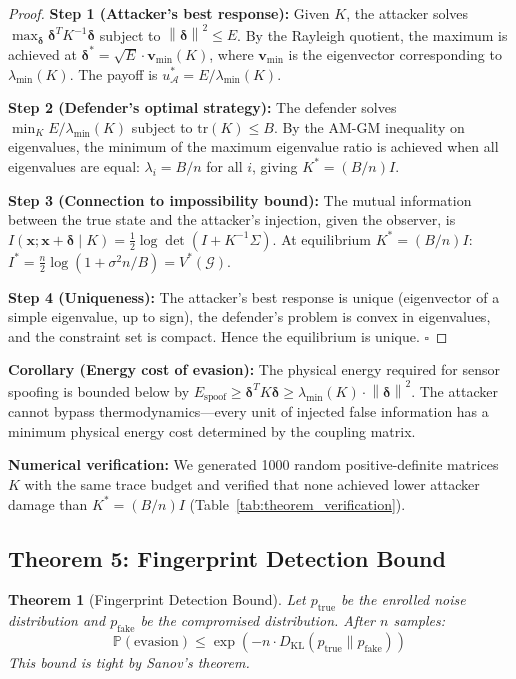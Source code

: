\documentclass[journal]{IEEEtran}
\newtheorem{theorem}{Theorem}
\newcommand{\norm}[1]{\left\|#1\right\|}
\newcommand{\Prob}{\mathbb{P}}
\newcommand{\KL}{D_{\mathrm{KL}}}
\begin{document}
\begin{proof}
\textbf{Step 1 (Attacker's best response):} Given $K$, the attacker solves $\max_{\bm{\delta}} \bm{\delta}^T K^{-1} \bm{\delta}$ subject to $\norm{\bm{\delta}}^2 \le E$. By the Rayleigh quotient, the maximum is achieved at $\bm{\delta}^* = \sqrt{E} \cdot \bm{v}_{\min}(K)$, where $\bm{v}_{\min}$ is the eigenvector corresponding to $\lambda_{\min}(K)$. The payoff is $u_{\mathcal{A}}^* = E / \lambda_{\min}(K)$.

\textbf{Step 2 (Defender's optimal strategy):} The defender solves $\min_K E / \lambda_{\min}(K)$ subject to $\text{tr}(K) \le B$. By the AM-GM inequality on eigenvalues, the minimum of the maximum eigenvalue ratio is achieved when all eigenvalues are equal: $\lambda_i = B/n$ for all $i$, giving $K^* = (B/n) I$.

\textbf{Step 3 (Connection to impossibility bound):} The mutual information between the true state and the attacker's injection, given the observer, is $I(\bm{x}; \bm{x}+\bm{\delta} \mid K) = \frac{1}{2} \log \det(I + K^{-1}\Sigma)$. At equilibrium $K^* = (B/n)I$: $I^* = \frac{n}{2}\log(1 + \sigma^2 n/B) = V^*(\mathcal{G})$.

\textbf{Step 4 (Uniqueness):} The attacker's best response is unique (eigenvector of a simple eigenvalue, up to sign), the defender's problem is convex in eigenvalues, and the constraint set is compact. Hence the equilibrium is unique. $\square$
\end{proof}

\textbf{Corollary (Energy cost of evasion):} The physical energy required for sensor spoofing is bounded below by $E_{\text{spoof}} \ge \bm{\delta}^T K \bm{\delta} \ge \lambda_{\min}(K) \cdot \norm{\bm{\delta}}^2$. The attacker cannot bypass thermodynamics---every unit of injected false information has a minimum physical energy cost determined by the coupling matrix.

\textbf{Numerical verification:} We generated 1000 random positive-definite matrices $K$ with the same trace budget and verified that none achieved lower attacker damage than $K^* = (B/n)I$ (Table~\ref{tab:theorem_verification}).

\subsection{Theorem 5: Fingerprint Detection Bound}

\begin{theorem}[Fingerprint Detection Bound]
\label{thm:fingerprint}
Let $p_{\text{true}}$ be the enrolled noise distribution and $p_{\text{fake}}$ be the compromised distribution. After $n$ samples:
\begin{equation}
  \Prob(\text{evasion}) \le \exp(-n \cdot \KL(p_{\text{true}} \| p_{\text{fake}}))
  \label{eq:fingerprint_bound}
\end{equation}
This bound is tight by Sanov's theorem.
\end{theorem}
\end{document}
